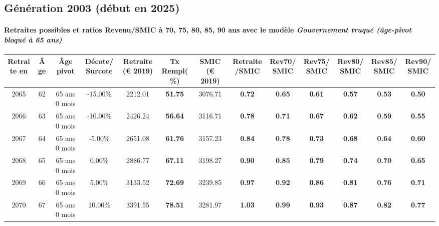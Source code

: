 \newpage 
 
\subsection{Génération 2003 (début en 2025)} 

\paragraph{Retraites possibles et ratios Revenu/SMIC à 70, 75, 80, 85, 90 ans avec le modèle \emph{Gouvernement truqué (âge-pivot bloqué à 65 ans)}}  
 
{ \scriptsize \begin{center} 
\begin{tabular}[htb]{|c|c||c|c||c|c||c||c|c|c|c|c|c|} 
\hline 
 Retraite en &  Âge &  Âge pivot &  Décote/Surcote &  Retraite (\euro{} 2019) &  Tx Rempl(\%) &  SMIC (\euro{} 2019) &  Retraite/SMIC &  Rev70/SMIC &  Rev75/SMIC &  Rev80/SMIC &  Rev85/SMIC &  Rev90/SMIC \\ 
\hline \hline 
 2065 &  62 &  65 ans 0 mois &  -15.00\% &  2212.01 &  {\bf 51.75} &  3076.71 &  {\bf {\color{red} 0.72}} &  {\bf {\color{red} 0.65}} &  {\bf {\color{red} 0.61}} &  {\bf {\color{red} 0.57}} &  {\bf {\color{red} 0.53}} &  {\bf {\color{red} 0.50}} \\ 
\hline 
 2066 &  63 &  65 ans 0 mois &  -10.00\% &  2426.24 &  {\bf 56.64} &  3116.71 &  {\bf {\color{red} 0.78}} &  {\bf {\color{red} 0.71}} &  {\bf {\color{red} 0.67}} &  {\bf {\color{red} 0.62}} &  {\bf {\color{red} 0.59}} &  {\bf {\color{red} 0.55}} \\ 
\hline 
 2067 &  64 &  65 ans 0 mois &  -5.00\% &  2651.08 &  {\bf 61.76} &  3157.23 &  {\bf {\color{red} 0.84}} &  {\bf {\color{red} 0.78}} &  {\bf {\color{red} 0.73}} &  {\bf {\color{red} 0.68}} &  {\bf {\color{red} 0.64}} &  {\bf {\color{red} 0.60}} \\ 
\hline 
 2068 &  65 &  65 ans 0 mois &  0.00\% &  2886.77 &  {\bf 67.11} &  3198.27 &  {\bf {\color{red} 0.90}} &  {\bf {\color{red} 0.85}} &  {\bf {\color{red} 0.79}} &  {\bf {\color{red} 0.74}} &  {\bf {\color{red} 0.70}} &  {\bf {\color{red} 0.65}} \\ 
\hline 
 2069 &  66 &  65 ans 0 mois &  5.00\% &  3133.52 &  {\bf 72.69} &  3239.85 &  {\bf {\color{red} 0.97}} &  {\bf {\color{red} 0.92}} &  {\bf {\color{red} 0.86}} &  {\bf {\color{red} 0.81}} &  {\bf {\color{red} 0.76}} &  {\bf {\color{red} 0.71}} \\ 
\hline 
 2070 &  67 &  65 ans 0 mois &  10.00\% &  3391.55 &  {\bf 78.51} &  3281.97 &  {\bf 1.03} &  {\bf {\color{red} 0.99}} &  {\bf {\color{red} 0.93}} &  {\bf {\color{red} 0.87}} &  {\bf {\color{red} 0.82}} &  {\bf {\color{red} 0.77}} \\ 
\hline 
\hline 
\end{tabular} 
\end{center} } 
